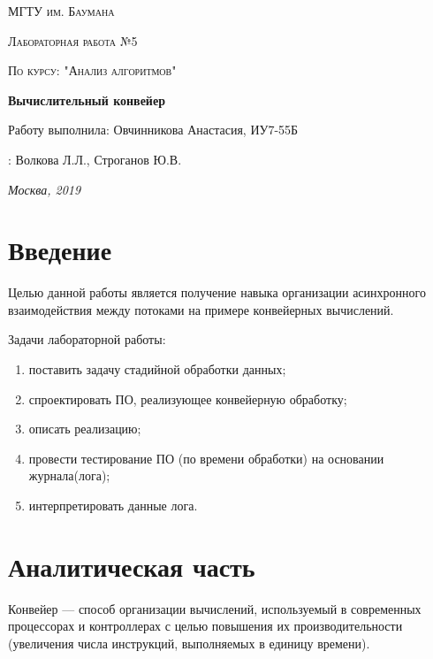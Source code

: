 \documentclass[a4paper,14pt]{report}
\begin{document}
\begin{titlepage}
	\centering
	{\scshape\LARGE МГТУ им. Баумана \par}
	\vspace{3cm}
	{\scshape\Large Лабораторная работа №5\par}
	\vspace{0.5cm}
	{\scshape\Large По курсу: "Анализ алгоритмов"\par}
	\vspace{1.5cm}
	{\huge\bfseries Вычислительный конвейер\par}
	\vspace{2cm}
	\Large Работу выполнила: Овчинникова Анастасия, ИУ7-55Б\par
	\vspace{0.5cm}
	:  Волкова Л.Л., Строганов Ю.В.\par

	\vfill
	\large \textit {Москва, 2019} \par
\end{titlepage}

\tableofcontents

\newpage
\chapter*{Введение}

Целью данной работы является получение навыка организации асинхронного взаимодействия между потоками на примере конвейерных вычислений.

Задачи лабораторной работы:
\begin{enumerate}
	\item поставить задачу стадийной обработки данных;
	\item спроектировать ПО, реализующее конвейерную обработку;
	\item описать реализацию;
  \item провести тестирование ПО (по времени обработки) на основании журнала(лога);
	\item интерпретировать данные лога.
\end{enumerate}


\chapter*{Аналитическая часть}
Конвейер — способ организации вычислений, используемый в современных процессорах и контроллерах с целью повышения их производительности (увеличения числа инструкций, выполняемых в единицу времени).
\end{document}
